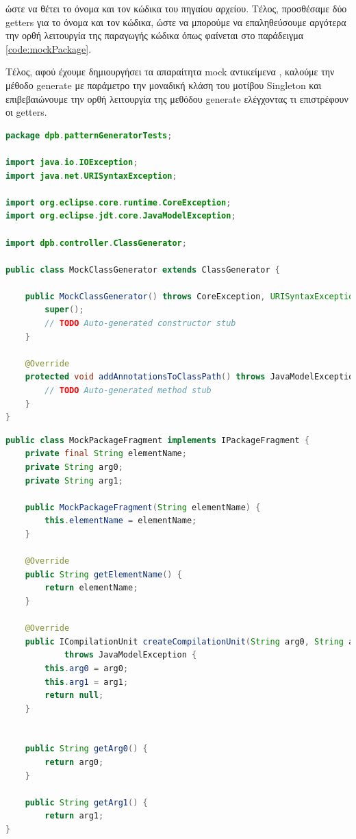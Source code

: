 ώστε να θέτει το όνομα και τον κώδικα του πηγαίου αρχείου. Τέλος, προσθέσαμε δύο getters για το όνομα και τον κώδικα, 
ώστε να μπορούμε να επαληθεύσουμε αργότερα την ορθή λειτουργία της παραγωγής κώδικα όπως φαίνεται στο παράδειγμα 
\ref{code:mockPackage}.\par Τέλος, αφού έχουμε δημιουργήσει τα απαραίτητα mock αντικείμενα \cite{SWEBOK}, 
καλούμε την μέθοδο generate με παράμετρο την μοναδική κλάση του μοτίβου Singleton και επιβεβαιώνουμε 
την ορθή λειτουργία της μεθόδου generate ελέγχοντας τι επιστρέφουν οι getters.
\newpage
\begin{lstlisting}[label=code:ClassGenerator, caption=Mock κλάση για την κλάση ClassGenerator, language=java]
package dpb.patternGeneratorTests;

import java.io.IOException;
import java.net.URISyntaxException;

import org.eclipse.core.runtime.CoreException;
import org.eclipse.jdt.core.JavaModelException;

import dpb.controller.ClassGenerator;

public class MockClassGenerator extends ClassGenerator {

    public MockClassGenerator() throws CoreException, URISyntaxException, IOException {
        super();
        // TODO Auto-generated constructor stub
    }

    @Override
    protected void addAnnotationsToClassPath() throws JavaModelException, URISyntaxException, IOException {
        // TODO Auto-generated method stub
    }
}
\end{lstlisting}
\newpage
\begin{lstlisting}[label=code:mockPackage, caption=Mock κλάση για την κλάση PackageFragment, language=java]
public class MockPackageFragment implements IPackageFragment {
    private final String elementName;
    private String arg0;
    private String arg1;
            
    public MockPackageFragment(String elementName) {
        this.elementName = elementName;
    }

    @Override
    public String getElementName() {
        return elementName;
    }

    @Override
    public ICompilationUnit createCompilationUnit(String arg0, String arg1, boolean arg2, IProgressMonitor arg3)
            throws JavaModelException {
        this.arg0 = arg0;
        this.arg1 = arg1;
        return null;
    }


    public String getArg0() {
        return arg0;
    }

    public String getArg1() {
        return arg1;
}
\end{lstlisting}
    



